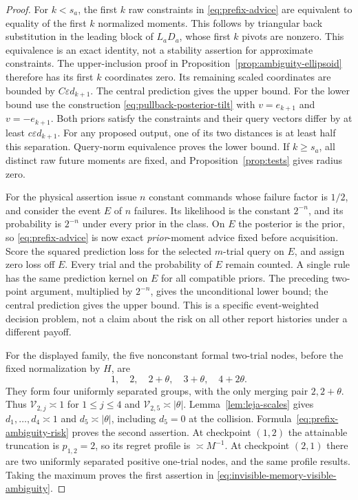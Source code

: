 \documentclass[11pt]{amsart}
\theoremstyle{definition}\newtheorem{definition}[theorem]{Definition}
\theoremstyle{remark}\newtheorem{remark}[theorem]{Remark}
\begin{document}
\begin{proof}
For $k<s_a$, the first $k$ raw constraints in
\eqref{eq:prefix-advice} are equivalent to equality of the first $k$
normalized moments. This follows by triangular back substitution in
the leading block of $L_aD_a$, whose first $k$ pivots are nonzero.
This equivalence is an exact identity, not a stability assertion for
approximate constraints. The upper-inclusion proof in
Proposition~\ref{prop:ambiguity-ellipsoid} therefore has its first $k$
coordinates zero. Its remaining scaled coordinates are bounded by
$C\varepsilon d_{k+1}$. The central prediction gives the upper bound.
For the lower bound use the construction
\eqref{eq:pullback-posterior-tilt} with $v=e_{k+1}$ and $v=-e_{k+1}$.
Both priors satisfy the constraints and their query vectors differ by
at least $c\varepsilon d_{k+1}$. For any proposed output, one of its
two distances is at least half this separation. Query-norm equivalence
proves the lower bound. If $k\ge s_a$, all distinct raw future moments
are fixed, and Proposition~\ref{prop:tests} gives radius zero.

For the physical assertion issue $n$ constant commands whose failure
factor is $1/2$, and consider the event $E$ of $n$ failures. Its
likelihood is the constant $2^{-n}$, and its probability is $2^{-n}$
under every prior in the class. On $E$ the posterior is the prior, so
\eqref{eq:prefix-advice} is now exact \emph{prior}-moment advice fixed
before acquisition. Score the squared prediction loss for the selected
$m$-trial query on $E$, and assign zero loss off $E$. Every trial and
the probability of $E$ remain counted. A single rule has the same
prediction kernel on $E$ for all compatible priors. The preceding
two-point argument, multiplied by $2^{-n}$, gives the unconditional
lower bound; the central prediction gives the upper bound. This is a
specific event-weighted decision problem, not a claim about the risk
on all other report histories under a different payoff.

For the displayed family, the five nonconstant formal two-trial nodes,
before the fixed normalization by $H$, are
\[
 1,\quad 2,\quad 2+\theta,\quad 3+\theta,\quad4+2\theta.
\]
They form four uniformly separated groups, with the only merging pair
$2,2+\theta$. Thus $\mathcal V_{2,j}\asymp1$ for $1\le j\le4$ and
$\mathcal V_{2,5}\asymp|\theta|$. Lemma~\ref{lem:leja-scales}
gives $d_1,\ldots,d_4\asymp1$ and $d_5\asymp|\theta|$,
including $d_5=0$ at the collision. Formula~\eqref{eq:prefix-ambiguity-risk}
proves the second assertion. At checkpoint $(1,2)$ the attainable
truncation is $p_{1,2}=2$, so its regret profile is $\asymp M^{-1}$.
At checkpoint $(2,1)$ there are two uniformly separated positive
one-trial nodes, and the same profile results. Taking the maximum proves
the first assertion in \eqref{eq:invisible-memory-visible-ambiguity}.
\end{proof}
\end{document}
